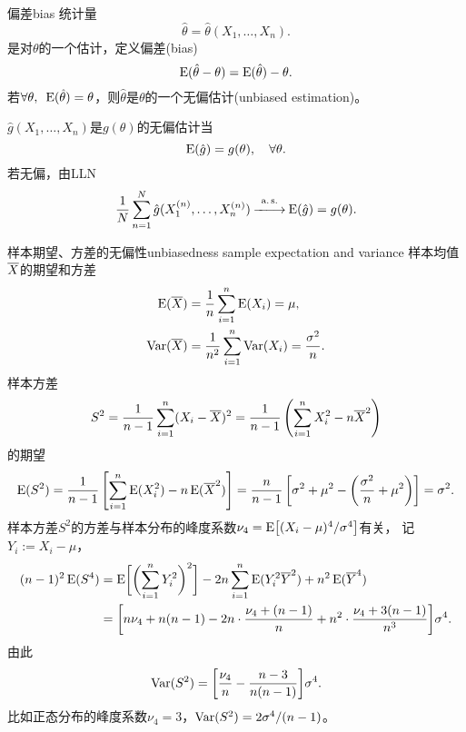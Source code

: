 \begin{definition}{偏差}{bias}
	统计量
	\[
		\hat\theta=\hat\theta(X_1,\ldots,X_n).
	\]
	是对$\theta$的一个估计，定义偏差(bias)%
	\begin{equation}
		\operatorname{E}(\hat\theta-\theta)=\operatorname{E}(\hat\theta)-\theta.
	\end{equation}
	若$\forall\theta,\enspace\operatorname{E}(\hat\theta)=\theta$，则$\hat\theta$是$\theta$的一个无偏估计(unbiased estimation)。
\end{definition}
$\hat g(X_1,\ldots,X_n)$是$g(\theta)$的无偏估计当
\[
	\operatorname{E}(\hat g)=g(\theta),\quad\forall\theta.
\]
若无偏，由LLN
\[
	\frac1{N}\sum_{n=1}^N\hat g(X_1^{(n)},\ldots,X_n^{(n)})\overset{\text{a.}\,\text{s.}}{-\hspace{-4pt}-\hspace{-5pt}\longrightarrow}\operatorname{E}(\hat g)=g(\theta).
\]
\begin{example}{样本期望、方差的无偏性}{unbiasedness sample expectation and variance}
	样本均值$\overline{X}$的期望和方差
	\begin{subequations}
		\begin{align}
			\label{eq:E(avg X)}
			\operatorname{E}(\overline{X})&=\frac1n\sum_{i=1}^n\operatorname{E}(X_i)=\mu,\\
			\label{eq:Var(avg X)}
			\operatorname{Var}(\overline{X})&=\frac1{n^2}\sum_{i=1}^n\operatorname{Var}(X_i)=\frac{\sigma^2}n.
		\end{align}
	\end{subequations}
	样本方差
	\[
		S^2=\frac1{n-1}\sum_{i=1}^n(X_i-\overline{X})^2=\frac1{n-1}\left(\sum_{i=1}^nX_i^2-n\overline{X}^2\right)
	\]
	的期望
	\begin{equation}
		\label{eq:E(S2)}
		\operatorname{E}(S^2)=\frac1{n-1}\left[\sum_{i=1}^n\operatorname{E}(X_i^2)-n\operatorname{E}(\overline{X}^2)\right]=\frac n{n-1}\left[\sigma^2+\mu^2-\left(\frac{\sigma^2}n+\mu^2\right)\right]=\sigma^2.
	\end{equation}
	样本方差$S^2$的方差与样本分布的峰度系数$\nu_4=\operatorname{E}\bigl[(X_i-\mu)^4/\sigma^4\bigr]$有关，
	记$Y_i:=X_i-\mu$，
	\begin{align*}
		(n-1)^2\operatorname{E}(S^4)&=\operatorname{E}\biggl[\biggl(\sum_{i=1}^nY_i^2\biggr)^2\biggr]-2n\sum_{i=1}^n\operatorname{E}(Y_i^2\overline{Y}^2)+n^2\operatorname{E}(\overline{Y}^4)\\
		&=\biggl[n\nu_4+n(n-1)-2n\cdot\frac{\nu_4+(n-1)}n+n^2\cdot\frac{\nu_4+3(n-1)}{n^3}\biggr]\sigma^4.
	\end{align*}
	由此
	\begin{equation}
		\label{eq:Var(S2)}
		\operatorname{Var}(S^2)=\biggl[\frac{\nu_4}n-\frac{n-3}{n(n-1)}\biggr]\sigma^4.
	\end{equation}
	比如正态分布的峰度系数$\nu_4=3$，$\operatorname{Var}(S^2)=2\sigma^4/(n-1)$。
\end{example}
